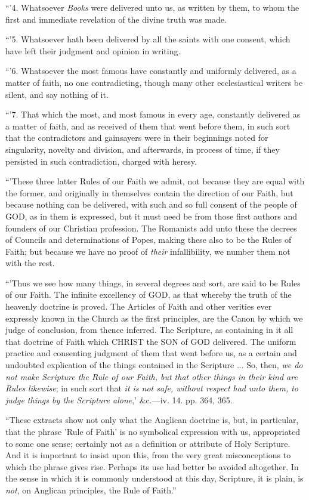 ``'4. Whatsoever \emph{Books} were delivered
unto us, as written by them, to whom the first and immediate
revelation of the divine truth was made.

``'5. Whatsoever hath been delivered by all the
saints with one consent, which have left their judgment and opinion in
writing.

``'6. Whatsoever the most famous have constantly
and uniformly delivered, as a matter of faith, no one contradicting,
though many other ecclesiastical writers be silent, and say nothing of
it.

``'7. That which the most, and most famous in
every age, constantly delivered as a matter of faith, and as received
of them that went before them, in such sort that the contradictors and
gainsayers were in their beginnings noted for singularity, novelty and
division, and afterwards, in process of time, if they persisted in
such contradiction, charged with heresy.

``'These three latter Rules of our Faith we
admit, not because they are equal with the former, and originally in
themselves contain the direction of our Faith, but because nothing can
be delivered, with such and so full consent of the people of GOD,
as in them is expressed, but it must need be from those first authors
and founders of our Christian profession. The Romanists add unto these
the decrees of Councils and determinations of Popes, making these also
to be the Rules of Faith; but because we have no proof of \emph{their}
infallibility, we number them not with the rest.

``'Thus we see how many things, in several
degrees and sort, are said to be Rules of our Faith. The infinite
excellency of GOD, as that
whereby the truth of the heavenly doctrine is proved. The Articles of
Faith and other verities ever expressly known in the Church as the
first principles, are the Canon by which we judge of conclusion, from thence inferred. The Scripture, as containing in it all that
doctrine of Faith which CHRIST
the SON of GOD
delivered. The uniform practice and consenting judgment of them that
went before us, as a certain and undoubted explication of the things
contained in the Scripture ... So, then, \emph{we do not make Scripture
the Rule of our Faith, but that other things in their kind are Rules
likewise}; in such sort that \emph{it is not safe, without respect had
unto them, to judge things by the Scripture alone},' \&c.—iv.
14. pp. 364, 365.

``These extracts show not only what the Anglican doctrine is,
but, in particular, that the phrase 'Rule of Faith' is no symbolical
expression with us, appropriated to some one sense; certainly not as a
definition or attribute of Holy Scripture. And it is important to
insist upon this, from the very great misconceptions to which the
phrase gives rise. Perhaps its use had better be avoided altogether.
In the sense in which it is commonly understood at this day,
Scripture, it is plain, is \emph{not}, on Anglican principles, the
Rule of Faith.''

